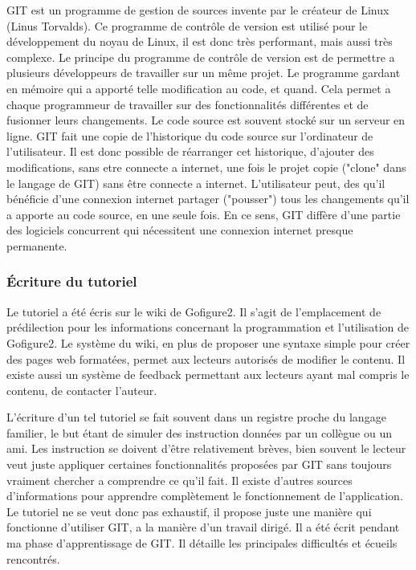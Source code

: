 GIT est un programme de gestion de sources invente par le créateur de Linux  (Linus Torvalds). Ce programme de contrôle de version est utilisé pour le développement du noyau de Linux, il est donc très performant, mais aussi très complexe.
Le principe du programme de contrôle de version est de permettre a plusieurs développeurs de travailler sur un même projet. Le programme gardant en mémoire qui a apporté telle modification au code, et quand. Cela permet a chaque programmeur de travailler sur des fonctionnalités différentes et de fusionner leurs changements.
Le code source est souvent stocké sur un serveur en ligne. GIT fait une copie de l'historique du code source sur l'ordinateur de l'utilisateur. Il est donc possible de réarranger cet historique, d'ajouter des modifications, sans etre connecte a internet, une fois le projet copie ("clone" dans le langage de GIT) sans être connecte a internet. L'utilisateur peut, des qu'il bénéficie d'une connexion internet partager ("pousser") tous les changements qu'il a apporte au code source, en une seule fois. En ce sens, GIT diffère d'une partie des logiciels concurrent qui nécessitent une connexion internet presque permanente.


\subsubsection{Écriture du tutoriel}

Le tutoriel a été écris sur le wiki de Gofigure2. Il s'agit de l'emplacement de prédilection pour les informations concernant la programmation et l'utilisation de Gofigure2. Le système du wiki, en plus de proposer une syntaxe simple pour créer des pages web formatées, permet aux lecteurs autorisés de modifier le contenu. Il existe aussi un système de feedback permettant aux lecteurs ayant mal compris le contenu, de contacter l'auteur.

L'écriture d'un tel tutoriel se fait souvent dans un registre proche du langage familier, le but étant de simuler des instruction données par un collègue ou un ami. Les instruction se doivent d'être relativement brèves, bien souvent le lecteur veut juste appliquer certaines fonctionnalités proposées par GIT sans toujours vraiment chercher a comprendre ce qu'il fait. Il existe d'autres sources d'informations pour apprendre complètement le fonctionnement de l'application.
Le tutoriel ne se veut donc pas exhaustif, il propose juste une manière qui fonctionne d'utiliser GIT, a la manière d'un travail dirigé. Il a été écrit pendant ma phase d'apprentissage de GIT. Il détaille les principales difficultés et écueils rencontrés. 

